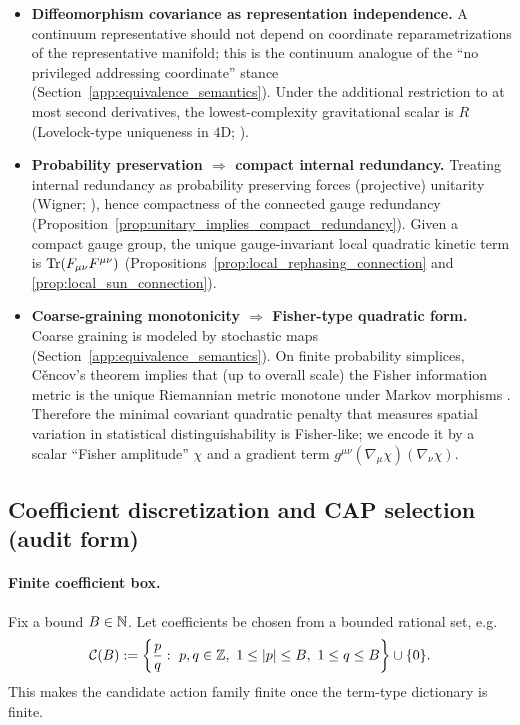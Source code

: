 \begin{itemize}
\item \textbf{Diffeomorphism covariance as representation independence.}
\InterfaceTag A continuum representative should not depend on coordinate reparametrizations of the representative manifold; this is the continuum analogue of the ``no privileged addressing coordinate'' stance (Section~\ref{app:equivalence_semantics}).
Under the additional restriction to at most second derivatives, the lowest-complexity gravitational scalar is $R$ (Lovelock-type uniqueness in $4$D; \cite{Lovelock1971}).

\item \textbf{Probability preservation $\Rightarrow$ compact internal redundancy.}
\InterfaceTag Treating internal redundancy as probability preserving forces (projective) unitarity (Wigner; \cite{Wigner1931}), hence compactness of the connected gauge redundancy (Proposition~\ref{prop:unitary_implies_compact_redundancy}).
Given a compact gauge group, the unique gauge-invariant local quadratic kinetic term is $\mathrm{Tr}(F_{\mu\nu}F^{\mu\nu})$ (Propositions~\ref{prop:local_rephasing_connection} and \ref{prop:local_sun_connection}).

\item \textbf{Coarse-graining monotonicity $\Rightarrow$ Fisher-type quadratic form.}
\InterfaceTag Coarse graining is modeled by stochastic maps (Section~\ref{app:equivalence_semantics}).
On finite probability simplices, C{\v{e}}ncov's theorem implies that (up to overall scale) the Fisher information metric is the unique Riemannian metric monotone under Markov morphisms \cite{Cencov1982}.
Therefore the minimal covariant quadratic penalty that measures spatial variation in statistical distinguishability is Fisher-like; we encode it by a scalar ``Fisher amplitude'' $\chi$ and a gradient term $g^{\mu\nu}(\nabla_\mu\chi)(\nabla_\nu\chi)$.
\end{itemize}

\subsection{Coefficient discretization and CAP selection (audit form)}
\label{subsec:cap_action_discretization}

\paragraph{Finite coefficient box.}
\AuditTag Fix a bound $B\in\mathbb{N}$.
Let coefficients be chosen from a bounded rational set, e.g.\
\[
\mathcal{C}(B):=\left\{\frac{p}{q}:\ p,q\in\ZZ,\ 1\le |p|\le B,\ 1\le q\le B\right\}\cup\{0\}.
\]
This makes the candidate action family finite once the term-type dictionary is finite.

